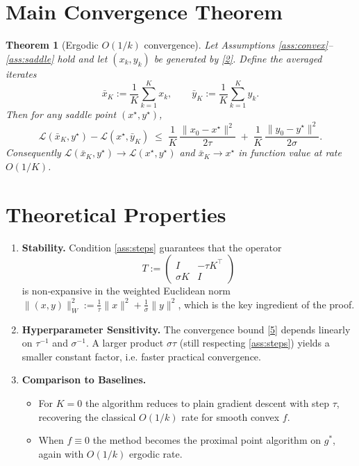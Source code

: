 \documentclass{article}
\newtheorem{theorem}{Theorem}
\begin{document}
\section*{Main Convergence Theorem}
\begin{theorem}[Ergodic $O(1/k)$ convergence]\label{thm:ergodic}
Let Assumptions \ref{ass:convex}–\ref{ass:saddle} hold and let $(x_{k},y_{k})$ be generated by \eqref{2}. Define the averaged iterates
\[
\bar{x}_{K}:=\frac{1}{K}\sum_{k=1}^{K}x_{k},\qquad 
\bar{y}_{K}:=\frac{1}{K}\sum_{k=1}^{K}y_{k}.
\]
Then for any saddle point $(x^{\star},y^{\star})$,
\[
\mathcal{L}(\bar{x}_{K},y^{\star})-\mathcal{L}(x^{\star},\bar{y}_{K})
\;\le\;
\frac{1}{K}\,
\frac{\|x_{0}-x^{\star}\|^{2}}{2\tau}
\;+\;
\frac{1}{K}\,
\frac{\|y_{0}-y^{\star}\|^{2}}{2\sigma}.
\tag{5}
\]
Consequently $\mathcal{L}(\bar{x}_{K},y^{\star})\to\mathcal{L}(x^{\star},y^{\star})$ and $\bar{x}_{K}\to x^{\star}$ in function value at rate $O(1/K)$.
\end{theorem}

\section*{Theoretical Properties}
\begin{enumerate}[noitemsep]
\item \textbf{Stability.} Condition \eqref{ass:steps} guarantees that the operator
\[
T:=\begin{pmatrix}
I & -\tau K^{\!\top}\\
\sigma K & I
\end{pmatrix}
\]
is non‑expansive in the weighted Euclidean norm $\|(x,y)\|_{W}^{2}:=\frac{1}{\tau}\|x\|^{2}+\frac{1}{\sigma}\|y\|^{2}$, which is the key ingredient of the proof.
\item \textbf{Hyperparameter Sensitivity.} The convergence bound \eqref{5} depends linearly on $\tau^{-1}$ and $\sigma^{-1}$. A larger product $\sigma\tau$ (still respecting \eqref{ass:steps}) yields a smaller constant factor, i.e. faster practical convergence.
\item \textbf{Comparison to Baselines.}
    \begin{itemize}[noitemsep]
        \item For $K=0$ the algorithm reduces to plain gradient descent with step $\tau$, recovering the classical $O(1/k)$ rate for smooth convex $f$.
        \item When $f\equiv0$ the method becomes the proximal point algorithm on $g^{*}$, again with $O(1/k)$ ergodic rate.
    \end{itemize}
\end{enumerate}
\end{document}
